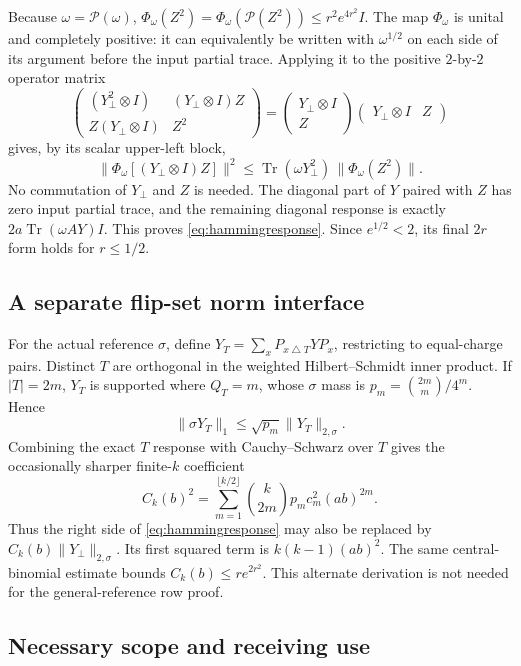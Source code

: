 Because $\omega=\mathcal P(\omega)$,
$\Phi_\omega(Z^2)=\Phi_\omega(\mathcal P(Z^2))
\le r^2e^{4r^2}I$.
The map $\Phi_\omega$ is unital and completely positive: it can equivalently
be written with $\omega^{1/2}$ on each side of its argument before the
input partial trace. Applying it to the positive $2$-by-$2$ operator matrix
\[
 \begin{pmatrix}
 (Y_\perp^2\otimes I)&(Y_\perp\otimes I)Z\\
 Z(Y_\perp\otimes I)&Z^2
 \end{pmatrix}
 =
 \begin{pmatrix}Y_\perp\otimes I\\Z\end{pmatrix}
 \begin{pmatrix}Y_\perp\otimes I&Z\end{pmatrix}
\]
gives, by its scalar upper-left block,
\[
 \|\Phi_\omega[(Y_\perp\otimes I)Z]\|^2
 \le \operatorname{Tr}(\omega Y_\perp^2)\,
        \|\Phi_\omega(Z^2)\|.
\]
No commutation of $Y_\perp$ and $Z$ is needed. The diagonal part of $Y$
paired with $Z$ has zero input partial trace, and the remaining diagonal
response is exactly $2a\operatorname{Tr}(\omega AY)I$.
This proves \eqref{eq:hammingresponse}. Since $e^{1/2}<2$, its final
$2r$ form holds for $r\le1/2$.

\subsection{A separate flip-set norm interface}

For the actual reference $\sigma$, define
$Y_T=\sum_xP_{x\mathbin{\triangle}T}YP_x$, restricting to equal-charge
pairs. Distinct $T$ are orthogonal in the weighted Hilbert--Schmidt inner
product. If $|T|=2m$, $Y_T$ is supported where $Q_T=m$, whose $\sigma$
mass is $p_m=\binom{2m}{m}/4^m$. Hence
\[
 \|\sigma Y_T\|_1
 \le\sqrt{p_m}\|Y_T\|_{2,\sigma}.
\]
Combining the exact $T$ response with Cauchy--Schwarz over $T$ gives
the occasionally sharper finite-$k$ coefficient
\[
 C_k(b)^2=\sum_{m=1}^{\lfloor k/2\rfloor}
 \binom{k}{2m}p_m c_m^2(ab)^{2m}.
\]
Thus the right side of \eqref{eq:hammingresponse} may also be replaced
by $C_k(b)\|Y_\perp\|_{2,\sigma}$. Its first squared term is
$k(k-1)(ab)^2$. The same central-binomial estimate bounds
$C_k(b)\le re^{2r^2}$. This alternate derivation is not needed for the
general-reference row proof.

\subsection{Necessary scope and receiving use}

